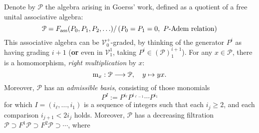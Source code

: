 \documentclass[11pt]{amsart}
\theoremstyle{plain}
\theoremstyle{definition}
\renewcommand{\to}{\longrightarrow}
\newcommand{\scrL}{\mathscr{L}}
\newcommand{\scrC}{\mathscr{C}}
\newcommand{\calW}{\mathcal{W}}
\newcommand{\calU}{\mathcal{U}}
\newcommand{\calP}{\mathcal{P}}
\newcommand{\calV}{\mathcal{V}}
\theoremstyle{plain}
\newcommand{\Palg}{{\calP}}
\newcommand{\LieOperad}{{\scrL}}
\newcommand{\vect}[2]{\calV^{#1}_{#2}}
\newcommand{\algs}{\scrC\!\textit{om}}
\begin{document}
\begin{Constructing homotopy and cohomotopy operations}
%
%
\begin{shaded}\tiny
Denote by $\Palg$ the algebra arising in Goerss' work, defined as a quotient of a free unital associative algebra:
\[\Palg=F_{\textup{ass}}(P_0,P_1,P_2,\ldots)/\left(P_0=P_1=0,\ \textup{$P$-Adem relation}\right)\]
This associative algebra can be $\vect{+}{0}$-graded, by thinking of the generator $P^i$ as having grading $i+1$ (\textbf{or} even in $\vect{1}{1}$, taking $P^i\in(\Palg)^{i+1}_1$). For any $x\in\Palg$, there is a homomorphism, \emph{right multiplication} by $x$:
\[\textup{m}_x:\Palg\to \Palg,\quad y\mapsto yx.\]
Moreover, $\Palg$ has an \emph{admissible basis}, consisting of those monomials
\[P^I:=P^{i_\ell}P^{i_{\ell-1}}\cdots P^{i_1}\]
for which $I=(i_\ell,\ldots,i_1)$ is a sequence of integers such that each $i_j\geq2$, and  each comparison $i_{j+1}< 2i_j$ holds. Moreover, $\Palg$ has a decreasing filtration $\Palg\supset F^1\Palg\supset F^2\Palg\supset\cdots $, where

\end{shaded}
\end{Constructing homotopy and cohomotopy operations}
\end{document}
